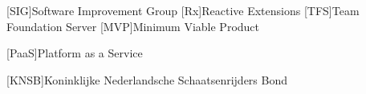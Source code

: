 [SIG]{Software Improvement Group}
[Rx]{Reactive Extensions}
[TFS]{Team Foundation Server}
[MVP]{Minimum Viable Product}

[PaaS]{Platform as a Service}

[KNSB]{Koninklijke Nederlandsche Schaatsenrijders Bond}
